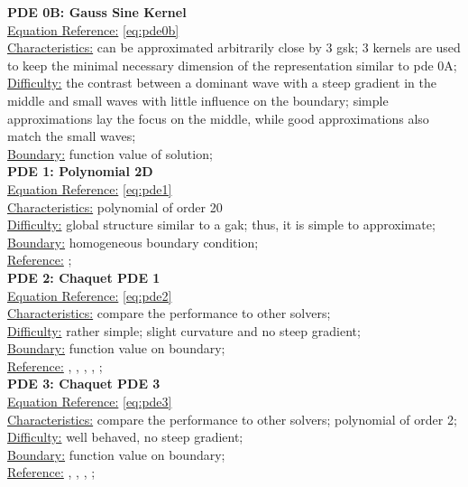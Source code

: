\documentclass[./\jobname.tex]{subfiles}
\begin{document}
\textbf{PDE 0B: Gauss Sine Kernel} \\
\underline{Equation Reference:} \eqref{eq:pde0b} \\
\underline{Characteristics:} can be approximated arbitrarily close by 3 \gls{gsk}; 3 kernels are used to keep the minimal necessary dimension of the representation similar to \gls{pde} 0A;\\
\underline{Difficulty:} the contrast between a dominant wave with a steep gradient in the middle and small waves with little influence on the boundary; simple approximations lay the focus on the middle, while good approximations also match the small waves; \\
\underline{Boundary:} function value of solution; \\

\textbf{PDE 1: Polynomial 2D} \\
\underline{Equation Reference:} \eqref{eq:pde1} \\
\underline{Characteristics:} polynomial of order 20 \\
\underline{Difficulty:} global structure similar to a \gls{gak}; thus, it is simple to approximate; \\
\underline{Boundary:} homogeneous boundary condition; \\
\underline{Reference:} \cite{mitchell_nist_2018}; \\

\textbf{PDE 2: Chaquet PDE 1} \\
\underline{Equation Reference:} \eqref{eq:pde2} \\
\underline{Characteristics:} compare the performance to other solvers; \\
\underline{Difficulty:} rather simple; slight curvature and no steep gradient; \\
\underline{Boundary:} function value on boundary; \\
\underline{Reference:} \cite{chaquet_using_2019}, \cite{chaquet_solving_2012}, \cite{tsoulos_solving_2006}, \cite{sobester_genetic_2008}, \cite{panagant_solving_2014};\\

\textbf{PDE 3: Chaquet PDE 3} \\
\underline{Equation Reference:} \eqref{eq:pde3} \\
\underline{Characteristics:} compare the performance to other solvers; polynomial of order 2; \\
\underline{Difficulty:} well behaved, no steep gradient; \\
\underline{Boundary:} function value on boundary; \\
\underline{Reference:} \cite{chaquet_using_2019}, \cite{chaquet_solving_2012}, \cite{tsoulos_solving_2006}, \cite{panagant_solving_2014}; \\
\end{document}
